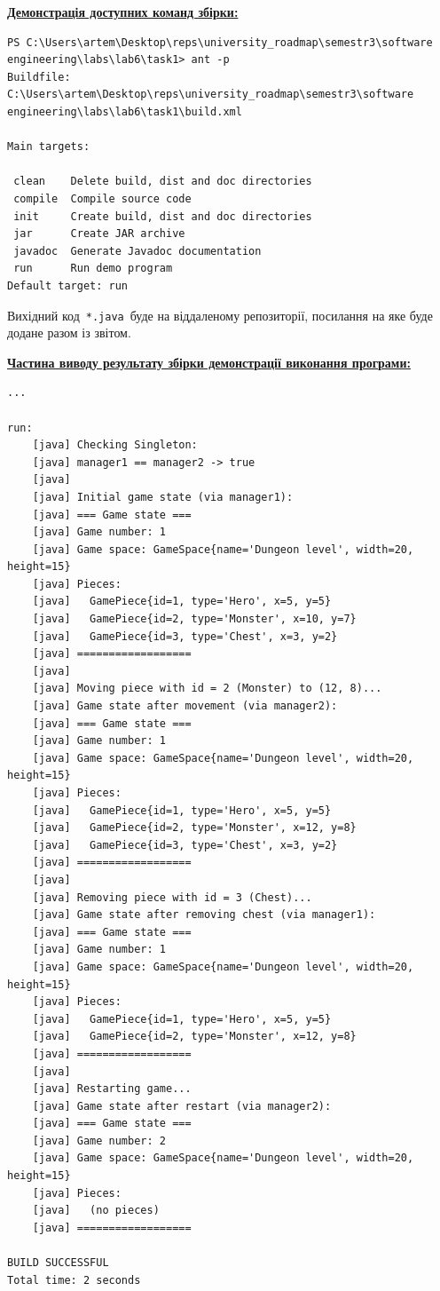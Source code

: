 \documentclass[12pt,a4paper]{article}
\begin{document}
    \textbf{\underline{Демонстрація доступних команд збірки:}}

    \begin{verbatim}
PS C:\Users\artem\Desktop\reps\university_roadmap\semestr3\software engineering\labs\lab6\task1> ant -p
Buildfile: C:\Users\artem\Desktop\reps\university_roadmap\semestr3\software engineering\labs\lab6\task1\build.xml

Main targets:

 clean    Delete build, dist and doc directories
 compile  Compile source code
 init     Create build, dist and doc directories
 jar      Create JAR archive
 javadoc  Generate Javadoc documentation
 run      Run demo program
Default target: run
    \end{verbatim}

    Вихідний код \,\texttt{*.java}\, буде на віддаленому репозиторії, посилання на яке буде додане разом із звітом.

    \vspace{1em}

    \textbf{\underline{Частина виводу результату збірки демонстрації виконання програми:}}

    \begin{verbatim}
...

run:
    [java] Checking Singleton:
    [java] manager1 == manager2 -> true
    [java]
    [java] Initial game state (via manager1):
    [java] === Game state ===
    [java] Game number: 1
    [java] Game space: GameSpace{name='Dungeon level', width=20, height=15}
    [java] Pieces:
    [java]   GamePiece{id=1, type='Hero', x=5, y=5}
    [java]   GamePiece{id=2, type='Monster', x=10, y=7}
    [java]   GamePiece{id=3, type='Chest', x=3, y=2}
    [java] ==================
    [java]
    [java] Moving piece with id = 2 (Monster) to (12, 8)...
    [java] Game state after movement (via manager2):
    [java] === Game state ===
    [java] Game number: 1
    [java] Game space: GameSpace{name='Dungeon level', width=20, height=15}
    [java] Pieces:
    [java]   GamePiece{id=1, type='Hero', x=5, y=5}
    [java]   GamePiece{id=2, type='Monster', x=12, y=8}
    [java]   GamePiece{id=3, type='Chest', x=3, y=2}
    [java] ==================
    [java]
    [java] Removing piece with id = 3 (Chest)...
    [java] Game state after removing chest (via manager1):
    [java] === Game state ===
    [java] Game number: 1
    [java] Game space: GameSpace{name='Dungeon level', width=20, height=15}
    [java] Pieces:
    [java]   GamePiece{id=1, type='Hero', x=5, y=5}
    [java]   GamePiece{id=2, type='Monster', x=12, y=8}
    [java] ==================
    [java]
    [java] Restarting game...
    [java] Game state after restart (via manager2):
    [java] === Game state ===
    [java] Game number: 2
    [java] Game space: GameSpace{name='Dungeon level', width=20, height=15}
    [java] Pieces:
    [java]   (no pieces)
    [java] ==================

BUILD SUCCESSFUL
Total time: 2 seconds
    \end{verbatim}
\end{document}
